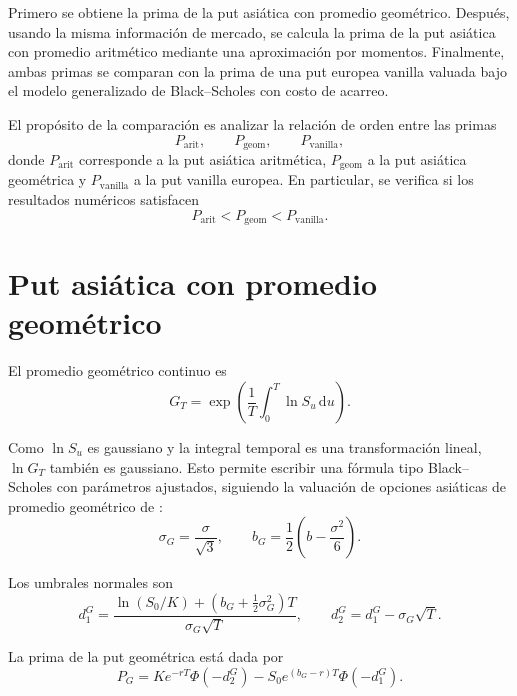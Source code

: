 \documentclass[11pt,letterpaper]{article}
\newcommand{\dd}{\,\mathrm{d}}
\newcommand{\PhiN}{\Phi}
\begin{document}
Primero se obtiene la prima de la put asiática con promedio geométrico. Después, usando la misma información de mercado, se calcula la prima de la put asiática con promedio aritmético mediante una aproximación por momentos. Finalmente, ambas primas se comparan con la prima de una put europea vanilla valuada bajo el modelo generalizado de Black--Scholes con costo de acarreo.

El propósito de la comparación es analizar la relación de orden entre las primas
\begin{equation}
P_{\mathrm{arit}},
\qquad
P_{\mathrm{geom}},
\qquad
P_{\mathrm{vanilla}},
\end{equation}
donde \(P_{\mathrm{arit}}\) corresponde a la put asiática aritmética, \(P_{\mathrm{geom}}\) a la put asiática geométrica y \(P_{\mathrm{vanilla}}\) a la put vanilla europea. En particular, se verifica si los resultados numéricos satisfacen
\begin{equation}
P_{\mathrm{arit}}
<
P_{\mathrm{geom}}
<
P_{\mathrm{vanilla}}.
\end{equation}

\section{Put asiática con promedio geométrico}

El promedio geométrico continuo es
\begin{equation}
G_T=\exp\left(\frac{1}{T}\int_0^T\ln S_u\dd u\right).
\end{equation}

Como \(\ln S_u\) es gaussiano y la integral temporal es una transformación lineal, \(\ln G_T\) también es gaussiano. Esto permite escribir una fórmula tipo Black--Scholes con parámetros ajustados, siguiendo la valuación de opciones asiáticas de promedio geométrico de \citet{kemna1990}:
\begin{equation}
\sigma_G=\frac{\sigma}{\sqrt{3}},
\qquad
b_G=\frac{1}{2}\left(b-\frac{\sigma^2}{6}\right).
\end{equation}

Los umbrales normales son
\begin{equation}
d_1^G=\frac{\ln(S_0/K)+(b_G+\frac{1}{2}\sigma_G^2)T}{\sigma_G\sqrt{T}},
\qquad
 d_2^G=d_1^G-\sigma_G\sqrt{T}.
\end{equation}

La prima de la put geométrica está dada por
\begin{equation}
P_G=Ke^{-rT}\PhiN(-d_2^G)-S_0e^{(b_G-r)T}\PhiN(-d_1^G).
\end{equation}
\end{document}

